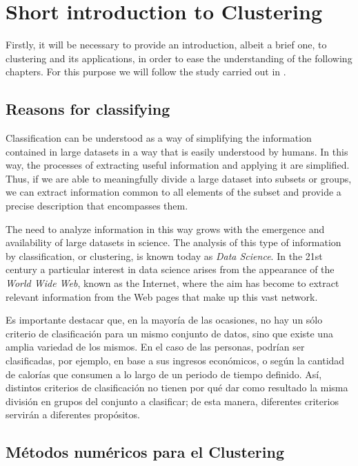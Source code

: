 
\chapter{Short introduction to Clustering}\label{ch:Breve introducción al Clustering}

Firstly, it will be necessary to provide an introduction, albeit a brief one, to clustering and its applications, in order to ease the understanding of the following chapters. For this purpose we will follow the study carried out in \cite{Everitt:2009:CA:1538772}.

\section{Reasons for classifying}

Classification can be understood as a way of simplifying the information contained in large datasets in a way that is easily understood by humans. In this way, the processes of extracting useful information and applying it are simplified. Thus, if we are able to meaningfully divide a large dataset into subsets or groups, we can extract information common to all elements of the subset and provide a precise description that encompasses them.

The need to analyze information in this way grows with the emergence and availability of large datasets in science. The analysis of this type of information by classification, or clustering, is known today as \textit{Data Science}. In the 21st century a particular interest in data science arises from the appearance of the \textit{World Wide Web}, known as the Internet, where the aim has become to extract relevant information from the Web pages that make up this vast network.

Es importante destacar que, en la mayoría de las ocasiones, no hay un sólo criterio de clasificación para un mismo conjunto de datos, sino que existe una amplia variedad de los mismos. En el caso de las personas, podrían ser clasificadas, por ejemplo, en base a sus ingresos económicos, o según la cantidad de calorías que consumen a lo largo de un periodo de tiempo definido. Así, distintos criterios de clasificación no tienen por qué dar como resultado la misma división en grupos del conjunto a clasificar; de esta manera, diferentes criterios servirán a diferentes propósitos.

\section{Métodos numéricos para el Clustering}


